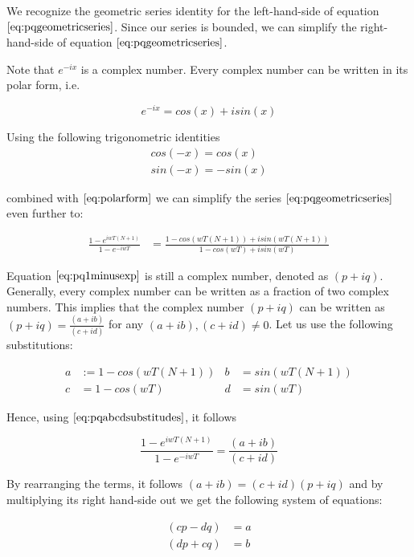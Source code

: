 We recognize the geometric series identity for the left-hand-side of equation $\ref{eq:pqgeometricseries}$. Since our series is bounded, we can simplify the right-hand-side of equation $\ref{eq:pqgeometricseries}$.

Note that $e^{-ix}$ is a complex number. Every complex number can be written in its polar form, i.e. 

\begin{equation}
e^{-ix} = cos(x) + i sin(x) 
\label{eq:polarform}
\end{equation}

Using the following trigonometric identities
\begin{gather}
cos(-x) = cos(x) \nonumber \\
sin(-x) = -sin(x)
\end{gather}

combined with $\ref{eq:polarform}$ we can simplify the series $\ref{eq:pqgeometricseries}$ even further to:

\begin{align}
\frac{1-e^{iwT(N+1)}}{1-e^{-iwT}}
& =\frac{1-cos(wT(N+1)) + i sin(wT(N+1)) }{1-cos(wT) + i sin(wT)}
\label{eq:pq1minusexp}
\end{align}

Equation $\ref{eq:pq1minusexp}$ is still a complex number, denoted as $(p+iq)$. Generally, every complex number can be written as a fraction of two complex numbers. This implies that the complex number $(p+iq)$ can be written as $(p+iq) = \frac{(a+ib)}{(c+id)}$ for any $(a+ib), (c+id) \neq 0$. Let us use the following substitutions: 

\begin{align}
a& := 1 - cos(wT(N+1))&
b& =sin(wT(N+1)) \nonumber \\
c& =1-cos(wT)&
d& =sin(wT)
\label{eq:pqabcdsubstitudes}
\end{align}

Hence, using $\ref{eq:pqabcdsubstitudes}$, it follows 

\begin{equation}
  \frac{1-e^{iwT(N+1)}}{1-e^{-iwT}} = \frac{(a+ib)}{(c+id)}
\end{equation}

By rearranging the terms, it follows $(a+ib) = (c+id)(p+iq)$ and by multiplying its right hand-side out we get the following system of equations:

\begin{align}
(cp-dq)& =a \nonumber \\
(dp + cq)& =b
\label{eq:cdadcn}
\end{align}

